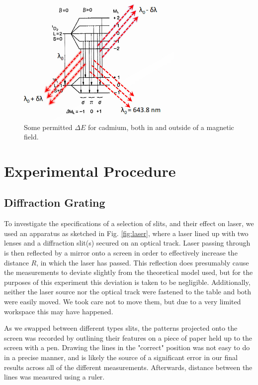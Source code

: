 \documentclass[11pt,a4paper]{article}
\begin{document}
      \begin{figure}[H]
        \center 
        \includegraphics[width=8cm]{scripts/figs/ZEEMAN_ENERGYLEVELS.jpg}
        \caption{Some permitted $\Delta E$ for cadmium, both in and outside of a magnetic field.}
        \label{fig:zeeman_energy}
      \end{figure}


\section{\label{section:experimental}Experimental Procedure} 
    \subsection{Diffraction Grating\label{exp:diffgrat}}
      To investigate the specifications of a selection of slits, and their effect on laser, we used an apparatus as sketched in Fig. \ref{fig:laser}, where a laser lined up with two lenses and a diffraction slit(s) secured on an optical track. Laser passing through is then reflected by a mirror onto a screen in order to effectively increase the distance $R$, in which the laser has passed. This reflection does presumably cause the measurements to deviate slightly from the theoretical model used, but for the purposes of this experiment this deviation is taken to be negligible. 
      Additionally, neither the laser source nor the optical track were fastened to the table and both were easily moved. We took care not to move them, but due to a very limited workspace this may have happened.

      As we swapped between different types slits, the patterns projected onto the screen was recorded by outlining their features on a piece of paper held up to the screen with a pen. Drawing the lines in the "correct" position was not easy to do in a precise manner, and is likely the source of a significant error in our final results across all of the different measurements. Afterwards, distance between the lines was measured using a ruler.
\end{document}
